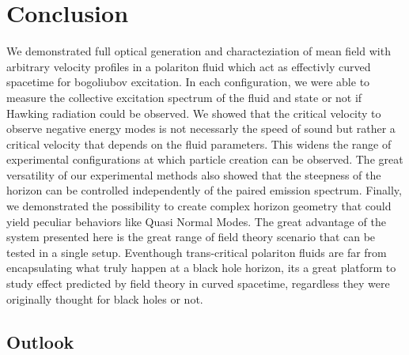 \section{Conclusion}

We demonstrated full optical generation and characteziation of mean field with arbitrary velocity profiles in a polariton fluid which act as effectivly curved spacetime for 
bogoliubov excitation. In each
configuration, we were able to measure the collective excitation spectrum of the fluid and state or not if Hawking radiation could be observed. We showed that the critical velocity to observe negative energy modes is not necessarly the speed of sound but rather a critical velocity 
that depends on the fluid parameters. This widens the range of experimental configurations at which particle creation can be observed. The great versatility of our experimental methods also showed that the steepness of the horizon can be controlled independently of the paired emission spectrum.
Finally, we demonstrated the possibility to create complex horizon geometry that could yield peculiar behaviors like Quasi Normal Modes. The great 
advantage of the system presented here is the great range of field theory scenario that can be tested in a single setup. Eventhough
 trans-critical polariton fluids are far from encapsulating what truly happen at a black hole horizon, its a great platform to study effect predicted by field theory in curved spacetime, regardless they were
originally thought for black holes or not.

\subsection{Outlook}
